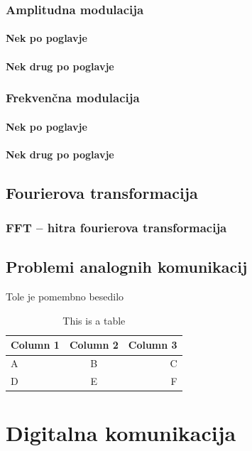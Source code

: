 \documentclass[12pt]{article}
\begin{document}
        \subsubsection{Amplitudna modulacija}
            \paragraph{Nek po poglavje}
            \paragraph{Nek drug po poglavje}
        \subsubsection{Frekvenčna modulacija}
            \paragraph{Nek po poglavje}
            \paragraph{Nek drug po poglavje}

    \newpage
    \subsection{Fourierova transformacija}
        \subsubsection{FFT – hitra fourierova transformacija}
    \subsection{Problemi analognih komunikacij}
        Tole je pomembno besedilo

\begin{table}[h]
    \centering
    \caption{This is a table}
    \begin{tabular}{lcr}
      \hline
      Column 1 & Column 2 & Column 3 \\
      \hline
      A & B & C \\
      D & E & F \\
      \hline
    \end{tabular}
    \label{tab:table}
\end{table}  


\newpage
\section{Digitalna komunikacija}
\end{document}
